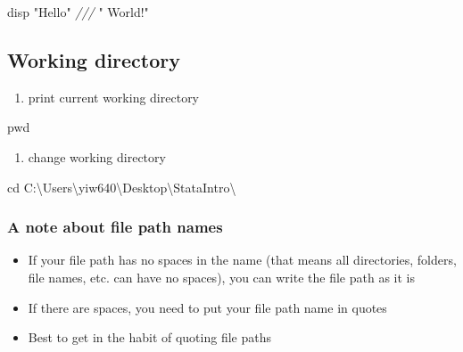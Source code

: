 \documentclass[
]{book}
\newenvironment{Shaded}{\begin{snugshade}}{\end{snugshade}}
\newcommand{\CommentTok}[1]{\textcolor[rgb]{0.56,0.35,0.01}{\textit{#1}}}
\newcommand{\NormalTok}[1]{#1}
\newcommand{\StringTok}[1]{\textcolor[rgb]{0.31,0.60,0.02}{#1}}
\providecommand{\tightlist}{%
  \setlength{\itemsep}{0pt}\setlength{\parskip}{0pt}}
\begin{document}
\begin{Shaded}
\begin{Highlighting}[]
\NormalTok{disp }\StringTok{"Hello"} \CommentTok{///}
     \StringTok{" World!"}
\end{Highlighting}
\end{Shaded}

\hypertarget{working-directory}{%
\subsection{Working directory}\label{working-directory}}

\begin{enumerate}
\def\labelenumi{\arabic{enumi}.}
\tightlist
\item
  print current working directory
\end{enumerate}

\begin{Shaded}
\begin{Highlighting}[]
\NormalTok{pwd }
\end{Highlighting}
\end{Shaded}

\begin{enumerate}
\def\labelenumi{\arabic{enumi}.}
\setcounter{enumi}{1}
\tightlist
\item
  change working directory
\end{enumerate}

\begin{Shaded}
\begin{Highlighting}[]
\NormalTok{cd C:\textbackslash{}Users\textbackslash{}yiw640\textbackslash{}Desktop\textbackslash{}StataIntro\textbackslash{}}
\end{Highlighting}
\end{Shaded}

\hypertarget{a-note-about-file-path-names}{%
\subsubsection{A note about file path names}\label{a-note-about-file-path-names}}

\begin{itemize}
\tightlist
\item
  If your file path has no spaces in the name (that means all directories, folders, file names, etc. can have no spaces), you can write the file path as it is
\item
  If there are spaces, you need to put your file path name in quotes
\item
  Best to get in the habit of quoting file paths
\end{itemize}
\end{document}
